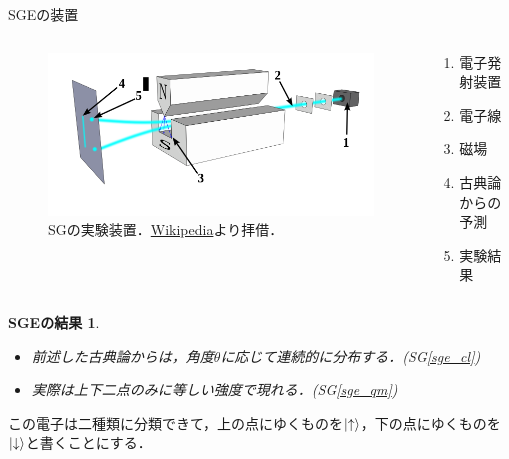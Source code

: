 \documentclass[dvipdfmx]{beamer}
\theoremstyle{break}
\newtheorem{result}[thm]{SGEの結果}
\newcommand{\up}{\ket{\uparrow}}
\newcommand{\down}{\ket{\downarrow}}
\begin{document}
\begin{frame}{SGEの装置}
		\begin{columns}
		\begin{column}{0.6\textwidth}
		\begin{figure}[t]
				\centering
				\includegraphics[keepaspectratio, scale=0.3]{./img/sg.png}
				\caption{SGの実験装置．\href{https://en.wikipedia.org/wiki/Stern\%E2\%80\%93Gerlach_experiment}{Wikipedia}より拝借．}
		\end{figure}
		\end{column}
		\begin{column}{0.4\textwidth}
		\begin{enumerate}[SG1]
				[default]
				\item 電子発射装置
				\item 電子線
				\item 磁場\label{sge_dev}
				\item 古典論からの予測\label{sge_cl}
				\item 実験結果\label{sge_qm}
		\end{enumerate}
		\end{column}
		\end{columns}
		\begin{result}\label{sgx}
				\begin{itemize}
						\item 前述した古典論からは，角度$\theta$に応じて連続的に分布する．(SG\ref{sge_cl})
						\item 実際は\alert{上下二点のみ}に\alert{等しい強度}で現れる．(SG\ref{sge_qm})
				\end{itemize}
		\end{result}
		この電子は二種類に分類できて，上の点にゆくものを$\up$，下の点にゆくものを$\down$と書くことにする．
\end{frame}
\end{document}
